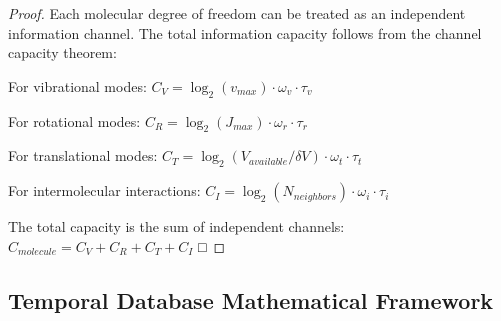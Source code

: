 \documentclass[12pt]{article}
\begin{document}
\begin{proof}
Each molecular degree of freedom can be treated as an independent information channel. The total information capacity follows from the channel capacity theorem:

For vibrational modes: $C_V = \log_2(v_{max}) \cdot \omega_v \cdot \tau_v$

For rotational modes: $C_R = \log_2(J_{max}) \cdot \omega_r \cdot \tau_r$  

For translational modes: $C_T = \log_2(V_{available}/\delta V) \cdot \omega_t \cdot \tau_t$

For intermolecular interactions: $C_I = \log_2(N_{neighbors}) \cdot \omega_i \cdot \tau_i$

The total capacity is the sum of independent channels:
$C_{molecule} = C_V + C_R + C_T + C_I$ □
\end{proof}

\subsection{Temporal Database Mathematical Framework}
\end{document}
